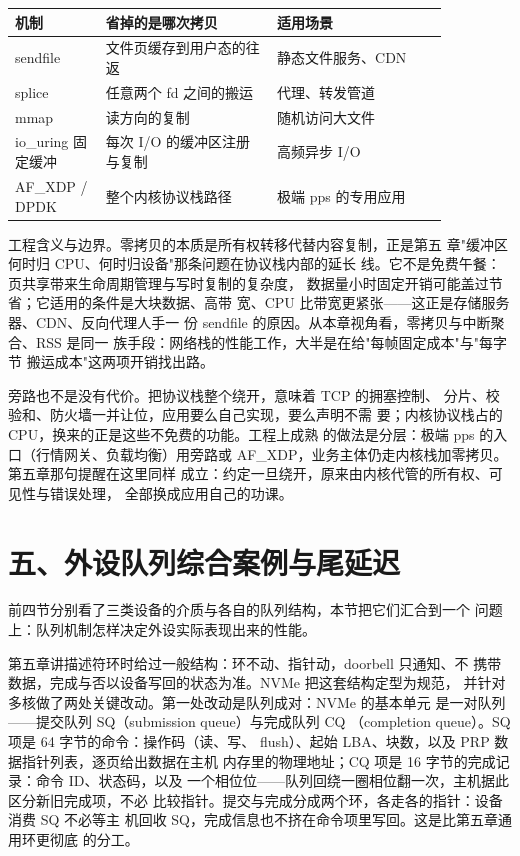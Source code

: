 \begin{longtable}{L{0.18\linewidth}L{0.34\linewidth}L{0.34\linewidth}}
\toprule
机制 & 省掉的是哪次拷贝 & 适用场景 \\
\midrule
sendfile & 文件页缓存到用户态的往返 & 静态文件服务、CDN \\
splice & 任意两个 fd 之间的搬运 & 代理、转发管道 \\
mmap & 读方向的复制 & 随机访问大文件 \\
io\_uring 固定缓冲 & 每次 I/O 的缓冲区注册与复制 & 高频异步 I/O \\
AF\_XDP / DPDK & 整个内核协议栈路径 & 极端 pps 的专用应用 \\
\bottomrule
\end{longtable}

工程含义与边界。零拷贝的本质是所有权转移代替内容复制，正是第五
章"缓冲区何时归 CPU、何时归设备"那条问题在协议栈内部的延长
线。它不是免费午餐：页共享带来生命周期管理与写时复制的复杂度，
数据量小时固定开销可能盖过节省；它适用的条件是大块数据、高带
宽、CPU 比带宽更紧张——这正是存储服务器、CDN、反向代理人手一
份 sendfile 的原因。从本章视角看，零拷贝与中断聚合、RSS 是同一
族手段：网络栈的性能工作，大半是在给"每帧固定成本"与"每字节
搬运成本"这两项开销找出路。

旁路也不是没有代价。把协议栈整个绕开，意味着 TCP 的拥塞控制、
分片、校验和、防火墙一并让位，应用要么自己实现，要么声明不需
要；内核协议栈占的 CPU，换来的正是这些不免费的功能。工程上成熟
的做法是分层：极端 pps 的入口（行情网关、负载均衡）用旁路或
AF\_XDP，业务主体仍走内核栈加零拷贝。第五章那句提醒在这里同样
成立：约定一旦绕开，原来由内核代管的所有权、可见性与错误处理，
全部换成应用自己的功课。

\section{五、外设队列综合案例与尾延迟}

前四节分别看了三类设备的介质与各自的队列结构，本节把它们汇合到一个
问题上：队列机制怎样决定外设实际表现出来的性能。

第五章讲描述符环时给过一般结构：环不动、指针动，doorbell 只通知、不
携带数据，完成与否以设备写回的状态为准。NVMe 把这套结构定型为规范，
并针对多核做了两处关键改动。第一处改动是队列成对：NVMe 的基本单元
是一对队列——提交队列 SQ（submission queue）与完成队列 CQ
（completion queue）。SQ 项是 64 字节的命令：操作码（读、写、
flush）、起始 LBA、块数，以及 PRP 数据指针列表，逐页给出数据在主机
内存里的物理地址；CQ 项是 16 字节的完成记录：命令 ID、状态码，以及
一个相位位——队列回绕一圈相位翻一次，主机据此区分新旧完成项，不必
比较指针。提交与完成分成两个环，各走各的指针：设备消费 SQ 不必等主
机回收 SQ，完成信息也不挤在命令项里写回。这是比第五章通用环更彻底
的分工。

